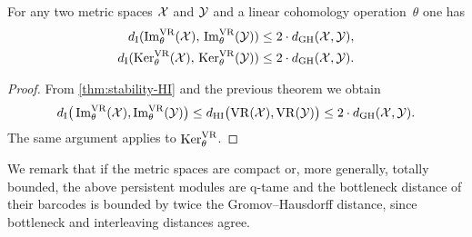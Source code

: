 \medskip\theorem For any two metric spaces $\mathcal{X}$ and $\mathcal{Y}$ and a linear cohomology operation~$\theta$ one has
\begin{align*}
	d_{\mathrm{I}}(\operatorname{Im}_\theta^{\mathrm{VR}}(\mathcal{X}),\, \operatorname{Im}_\theta^{\mathrm{VR}}(\mathcal{Y})) \leq 2 \cdot d_{\mathrm{GH}}(\mathcal{X},\mathcal{Y}), \\
	d_{\mathrm{I}}(\operatorname{Ker}_\theta^{\mathrm{VR}}(\mathcal{X}),\, \operatorname{Ker}_\theta^{\mathrm{VR}}(\mathcal{Y})) \leq 2 \cdot d_{\mathrm{GH}}(\mathcal{X},\mathcal{Y}).
\end{align*}

\begin{proof}
	From \cref{thm:stability-HI} and the previous theorem we obtain
	\[
	d_{\mathrm{I}}\big(\operatorname{Im}_\theta^{\mathrm{VR}}(\mathcal{X}), \operatorname{Im}_\theta^{\mathrm{VR}}(\mathcal{Y})\big) \leq
	d_{\mathrm{HI}}\big(\mathrm{VR}(\mathcal{X}), \mathrm{VR}(\mathcal{Y})\big) \leq 2 \cdot d_{\mathrm{GH}}(\mathcal{X},\mathcal{Y}).
	\]
	The same argument applies to $\operatorname{Ker}_\theta^{\mathrm{VR}}$.
\end{proof}

We remark that if the metric spaces are compact or, more generally, totally bounded, the above persistent modules are q-tame and the bottleneck distance of their barcodes is bounded by twice the Gromov--Hausdorff distance, since bottleneck and interleaving distances agree.